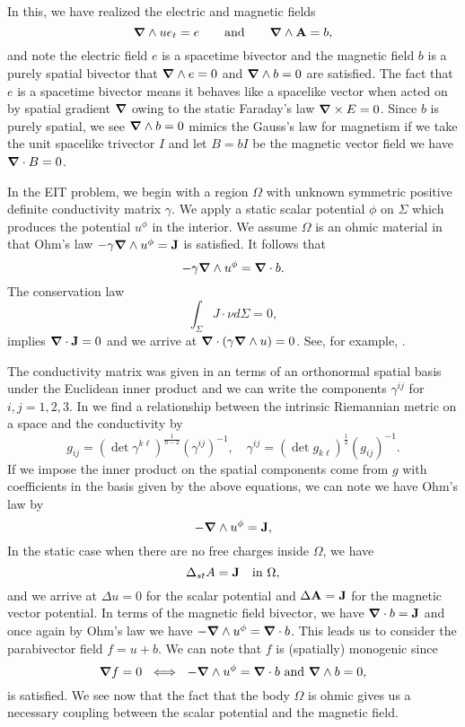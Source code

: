 In this, we have realized the electric and magnetic fields
\[
\boldsymbol{\nabla} \wedge u e_t = e \qquad \textrm{and} \qquad \boldsymbol{\nabla} \wedge \mathbf{A} = b,
\]
and note the electric field $e$ is a spacetime bivector and the magnetic field $b$ is a purely spatial bivector that $\boldsymbol{\nabla} \wedge e = 0$ and $\boldsymbol{\nabla} \wedge b =0$ are satisfied. The fact that $e$ is a spacetime bivector means it behaves like a spacelike vector when acted on by spatial gradient $\boldsymbol{\nabla}$ owing to the static Faraday's law $\boldsymbol{\nabla} \times E =0$. Since $b$ is purely spatial, we see $\boldsymbol{\nabla} \wedge b = 0$ mimics the Gauss's law for magnetism if we take the unit spacelike trivector $I$ and let $B=bI$ be the magnetic vector field we have $\boldsymbol{\nabla} \cdot B = 0$.

In the EIT problem, we begin with a region $\Omega$ with unknown symmetric positive definite conductivity matrix $\gamma$. We apply a static scalar potential $\phi$ on $\Sigma$ which produces the potential $u^\phi$ in the interior. We assume $\Omega$ is an ohmic material in that Ohm's law $-\gamma \boldsymbol{\nabla} \wedge u^\phi = \mathbf{J}$ is satisfied.  It follows that 
\[
-\gamma \boldsymbol{\nabla} \wedge u^\phi = \boldsymbol{\nabla} \cdot b.
\]
The conservation law
\[
\int_\Sigma J \cdot \nu d\Sigma = 0,
\]
implies $\boldsymbol{\nabla} \cdot \mathbf{J}= 0$ and we arrive at $\boldsymbol{\nabla} \cdot (\gamma \boldsymbol{\nabla} \wedge u) = 0$. See, for example, \cite{feldman_calderproblem_nodate}. 

The conductivity matrix was given in an terms of an orthonormal spatial basis under the Euclidean inner product and we can write the components $\gamma^{ij}$ for $i,j=1,2,3$.  In \cite{uhlmann_inverse_2014} we find a relationship between the intrinsic Riemannian metric on a space and the conductivity by
\begin{equation}
\label{eq:conductivity_metric}
    g_{ij} = (\det \gamma^{k\ell} )^{\frac{1}{n-2}} (\gamma^{ij})^{-1}, \quad \gamma^{ij} = (\det g_{k\ell})^{\frac{1}{2}} (g_{ij})^{-1}.
\end{equation}
If we impose the inner product on the spatial components come from $g$ with coefficients in the basis given by the above equations, we can note we have Ohm's law by
\[
-\boldsymbol{\nabla} \wedge u^\phi = \mathbf{J},
\]
In the static case when there are no free charges inside $\Omega$, we have
\[
\Delta_{st} A = \mathbf{J} \quad \textrm{in $\Omega$},
\]
and we arrive at $\Delta u = 0$ for the scalar potential and $\Delta \mathbf{A} = \mathbf{J}$ for the magnetic vector potential. In terms of the magnetic field bivector, we have $\boldsymbol{\nabla} \cdot b = \mathbf{J}$ and once again by Ohm's law we have $-\boldsymbol{\nabla} \wedge u^\phi = \boldsymbol{\nabla} \cdot b$. This leads us to consider the parabivector field $f=u+b$. We can note that $f$ is (spatially) monogenic since 
\[
\boldsymbol{\nabla} f = 0 ~\iff~ -\boldsymbol{\nabla} \wedge u^\phi =  \boldsymbol{\nabla} \cdot b ~\textrm{and}~ \boldsymbol{\nabla} \wedge b = 0,
\]
is satisfied. We see now that the fact that the body $\Omega$ is ohmic gives us a necessary coupling between the scalar potential and the magnetic field.

